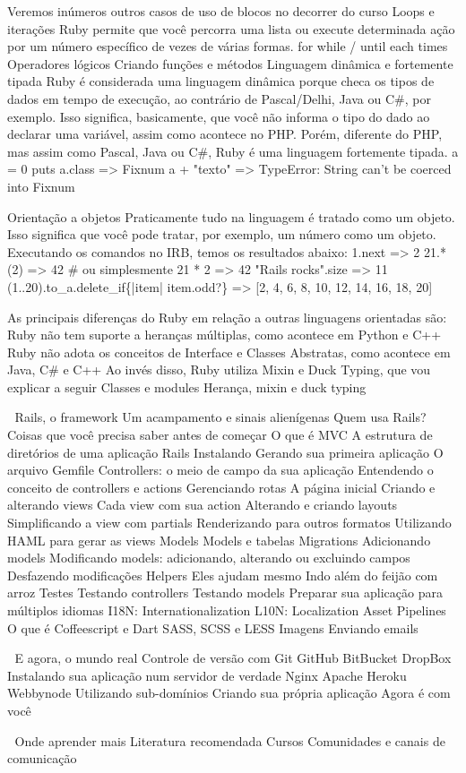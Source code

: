 \documentclass[12pt]{book} %
\begin{document}
Veremos inúmeros outros casos de uso de blocos no decorrer do curso
Loops e iterações
Ruby permite que você percorra uma lista ou execute determinada ação por um número específico de vezes de várias formas.
for
while / until
each
times
Operadores lógicos
Criando funções e métodos
Linguagem dinâmica e fortemente tipada
Ruby é considerada uma linguagem dinâmica porque checa os tipos de dados em tempo de execução, ao contrário de Pascal/Delhi, Java ou C\#, por exemplo. Isso significa, basicamente, que você não informa o tipo do dado ao declarar uma variável, assim como acontece no PHP. Porém, diferente do PHP, mas assim como Pascal, Java ou C\#, Ruby é uma linguagem fortemente tipada.
a = 0
puts a.class
=> Fixnum
a + "texto"
=> TypeError: String can't be coerced into Fixnum

Orientação a objetos
Praticamente tudo na linguagem é tratado como um objeto. Isso significa que você pode tratar, por exemplo, um número como um objeto.
Executando os comandos no IRB, temos os resultados abaixo:
1.next
=> 2
21.*(2)
=> 42
\# ou simplesmente
21 * 2
=> 42
"Rails rocks".size
=> 11
(1..20).to\_a.delete\_if\{|item| item.odd?\}
=> [2, 4, 6, 8, 10, 12, 14, 16, 18, 20]


As principais diferenças do Ruby em relação a outras linguagens orientadas são:
Ruby não tem suporte a heranças múltiplas, como acontece em Python e C++
Ruby não adota os conceitos de Interface e Classes Abstratas, como acontece em Java, C\# e C++
Ao invés disso, Ruby utiliza Mixin e Duck Typing, que vou explicar a seguir
Classes e modules
Herança, mixin e duck typing


Rails, o framework
Um acampamento e sinais alienígenas
Quem usa Rails?
Coisas que você precisa saber antes de começar
O que é MVC
A estrutura de diretórios de uma aplicação Rails
Instalando
Gerando sua primeira aplicação
O arquivo Gemfile
Controllers: o meio de campo da sua aplicação
Entendendo o conceito de controllers e actions
Gerenciando rotas
A página inicial
Criando e alterando views
Cada view com sua action
Alterando e criando layouts
Simplificando a view com partials
Renderizando para outros formatos
Utilizando HAML para gerar as views
Models
Models e tabelas
Migrations
Adicionando models
Modificando models: adicionando, alterando ou excluindo campos
Desfazendo modificações
Helpers
Eles ajudam mesmo
Indo além do feijão com arroz
Testes
Testando controllers
Testando models
Preparar sua aplicação para múltiplos idiomas
I18N: Internationalization
L10N: Localization
Asset Pipelines
O que é
Coffeescript e Dart
SASS, SCSS e LESS
Imagens
Enviando emails


E agora, o mundo real
Controle de versão com Git
GitHub
BitBucket
DropBox
Instalando sua aplicação num servidor de verdade
Nginx
Apache
Heroku
Webbynode
Utilizando sub-domínios
Criando sua própria aplicação
Agora é com você


Onde aprender mais
Literatura recomendada
Cursos
Comunidades e canais de comunicação
\end{document}
